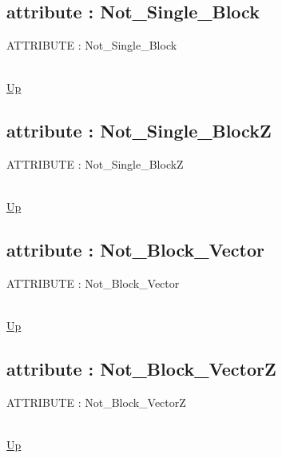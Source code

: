 \subsection*{attribute : Not\_Single\_Block}
\hypertarget{ecldoc:pbblas.constants.not_single_block}{ATTRIBUTE : Not\_Single\_Block} \\
\hyperlink{ecldoc:PBblas.Constants}{Up} \\
\par
\subsection*{attribute : Not\_Single\_BlockZ}
\hypertarget{ecldoc:pbblas.constants.not_single_blockz}{ATTRIBUTE : Not\_Single\_BlockZ} \\
\hyperlink{ecldoc:PBblas.Constants}{Up} \\
\par
\subsection*{attribute : Not\_Block\_Vector}
\hypertarget{ecldoc:pbblas.constants.not_block_vector}{ATTRIBUTE : Not\_Block\_Vector} \\
\hyperlink{ecldoc:PBblas.Constants}{Up} \\
\par
\subsection*{attribute : Not\_Block\_VectorZ}
\hypertarget{ecldoc:pbblas.constants.not_block_vectorz}{ATTRIBUTE : Not\_Block\_VectorZ} \\
\hyperlink{ecldoc:PBblas.Constants}{Up} \\
\par

